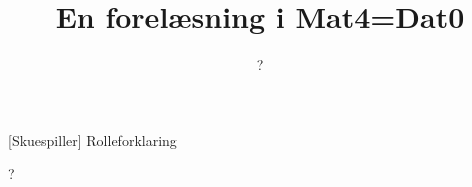 \documentclass[a4paper,11pt]{article}
\title{En forelæsning i Mat4=Dat0}
\author{?}
\begin{document}
\maketitle

\begin{roles}
[Skuespiller] Rolleforklaring
\end{roles}

\begin{sketch}
?
\end{sketch}
\end{document}
